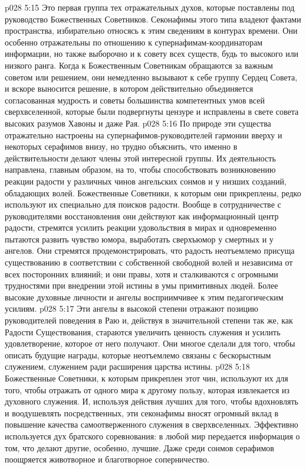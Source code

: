 \vs p028 5:15 \pc {}\bibnobreakspace {} Это первая группа тех отражательных духов, которые поставлены под руководство Божественных Советников. Секонафимы этого типа владеют фактами пространства, избирательно относясь к этим сведениям в контурах времени. Они особенно отражательны по отношению к супернафимам\hyp{}координаторам информации, но также выборочно и к совету всех существ, будь то высокого или низкого ранга. Когда к Божественным Советникам обращаются за важным советом или решением, они немедленно вызывают к себе группу Сердец Совета, и вскоре выносится решение, в котором действительно объединяется согласованная мудрость и советы большинства компетентных умов всей сверхвселенной, которые были подвергнуты цензуре и исправлены в свете совета высоких разумов Хавоны и даже Рая.
\vs p028 5:16 \pc {}\bibnobreakspace {} По природе эти существа отражательно настроены на супернафимов\hyp{}руководителей гармонии вверху и некоторых серафимов внизу, но трудно объяснить, что именно в действительности делают члены этой интересной группы. Их деятельность направлена, главным образом, на то, чтобы способствовать возникновению реакции радости у различных чинов ангельских сонмов и у низших созданий, обладающих волей. Божественные Советники, к которым они прикреплены, редко используют их специально для поисков радости. Вообще в сотрудничестве с руководителями восстановления они действуют как информационный центр радости, стремятся усилить реакции удовольствия в мирах и одновременно пытаются развить чувство юмора, выработать сверхъюмор у смертных и у ангелов. Они стремятся продемонстрировать, что радость неотъемлемо присуща существованию в соответствии с собственной свободной волей и независима от всех посторонних влияний; и они правы, хотя и сталкиваются с огромными трудностями при внедрении этой истины в умы примитивных людей. Более высокие духовные личности и ангелы восприимчивее к этим педагогическим усилиям.
\vs p028 5:17 \pc {}\bibnobreakspace {} Эти ангелы в высокой степени отражают позицию руководителей поведения в Раю и, действуя в значительной степени так же, как Радости Существования, стараются увеличить ценность служения и усилить удовлетворение, которое от него получают. Они многое сделали для того, чтобы описать будущие награды, которые неотъемлемо связаны с бескорыстным служением, служением ради расширения царства истины.
\vs p028 5:18 Божественные Советники, к которым прикреплен этот чин, используют их для того, чтобы отражать от одного мира к другому пользу, которая извлекается из духовного служения. И, используя действия лучших для того, чтобы вдохновлять и воодушевлять посредственных, эти секонафимы вносят огромный вклад в повышение качества самоотверженного служения в сверхвселенных. Эффективно используется дух братского соревнования: в любой мир передается информация о том, что делают другие, особенно, лучшие. Даже среди сонмов серафимов поощряется животворное и благотворное соперничество.
